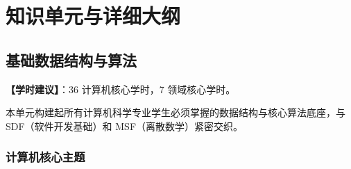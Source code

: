 \section{知识单元与详细大纲}

\subsection{基础数据结构与算法}
\textbf{【学时建议】}：36 计算机核心学时，7 领域核心学时。

本单元构建起所有计算机科学专业学生必须掌握的数据结构与核心算法底座，与 SDF（软件开发基础）和 MSF（离散数学）紧密交织。

\subsubsection{计算机核心主题}
